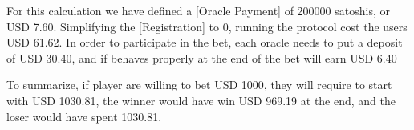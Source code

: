 For this calculation we have defined a [Oracle Payment] of \num{200000}
  satoshis, or USD 7.60. Simplifying the [Registration] to 0, running the
  protocol cost the users USD 61.62.
In order to participate in the bet, each oracle needs to put a deposit of
  USD 30.40, and if behaves properly at the end of the bet will earn USD 6.40

To summarize, if player are willing to bet USD 1000, they will require to start
  with USD 1030.81, the winner would have win USD 969.19 at the end, and the
  loser would have spent 1030.81.
